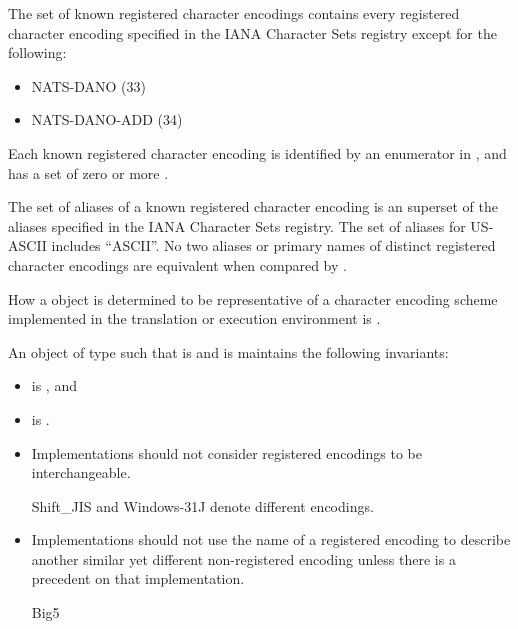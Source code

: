 \pnum
The set of known registered character encodings contains
every registered character encoding
specified in the IANA Character Sets registry except for the following:
\begin{itemize}
\item NATS-DANO (33)
\item NATS-DANO-ADD (34)
\end{itemize}

\pnum
Each known registered character encoding
is identified by an enumerator in , and
has a set of zero or more .

\pnum
The set of aliases of a known registered character encoding is an
superset of the aliases specified in the IANA Character Sets registry.
The set of aliases for US-ASCII includes ``ASCII''.
No two aliases or primary names of distinct registered character encodings
are equivalent when compared by .

\pnum
How a  object
is determined to be representative of a character encoding scheme
implemented in the translation or execution environment is
.

\pnum
An object  of type  such that
 is  and
 is 
maintains the following invariants:
\begin{itemize}
\item {} is , and
\item {} is .
\end{itemize}

\pnum
\recommended
\begin{itemize}
\item
Implementations should not consider registered encodings to be interchangeable.
\begin{example}
Shift_JIS and Windows-31J denote different encodings.
\end{example}
\item
Implementations should not use the name of a registered encoding
to describe another similar yet different non-registered encoding
unless there is a precedent on that implementation.
\begin{example}
Big5
\end{example}
\end{itemize}

